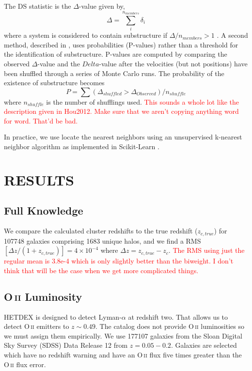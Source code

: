 \documentclass[apj, revtex4]{emulateapj}
\makeatletter
\newcommand{\editorial}[1]{\textcolor{red}{#1} }
\DeclareRobustCommand{\ion}[2]{%
\relax\ifmmode
\ifx\testbx\f@series
{\mathbf{#1\,\mathsc{#2}}}\else
{\mathrm{#1\,\mathsc{#2}}}\fi
\else\textup{#1\,{\mdseries\textsc{#2}}}%
\fi}
\makeatother
\begin{document}
The DS statistic is the $\Delta$-value given by, 
\begin{equation}
	\Delta = \sum^{n_{members}}_i \delta_i
\end{equation}
where a system is considered to contain substructure if $\Delta/n_{members} > 1$ \citep{Dressler1988}. A second method, described in \cite{Hou2012}, uses probabilities (P-values) rather than a threshold for the identification of substructure. P-values are computed by comparing the observed $\Delta$-value and the $Delta$-value after the velocities (but not positions) have been shuffled through a series of Monte Carlo runs. The probability of the existence of substructure becomes
\begin{equation}
	P = \sum (\Delta_{shuffled} > \Delta_{Observed}) / n_{shuffle}
\end{equation}
where $n_{shuffle}$ is the number of shufflings used. \editorial{This sounds a whole lot like the description given in Hou2012. Make sure that we aren't copying anything word for word. That'd be bad.}

In practice, we use locate the nearest neighbors using an unsupervised k-nearest neighbor algorithm as implemented in Scikit-Learn \citep{Pedregosa2012}. 

\section{RESULTS}

\subsection{Full Knowledge}
We compare the calculated cluster redshifts to the true redshift ($z_{c,true}$) for 107748 galaxies comprising 1683 unique halos, and we find a RMS$[\Delta z/(1+z_{c,true})]= 4\times 10^{-4}$ where $\Delta z = z_{c,true} - z_{c}$. \editorial{The RMS using just the regular mean is 3.8e-4 which is only slightly better than the biweight. I don't think that will be the case when we get more complicated things.}




\subsection{\ion{O}{ii} Luminosity}

HETDEX is designed to detect Lyman-$\alpha$ at redshift two. That allows us to detect \ion{O}{ii} emitters to $z\sim 0.49$. The catalog does not provide \ion{O}{ii} luminosities so we must assign them empirically. We use 177107 galaxies from the Sloan Digital Sky Survey (SDSS) Data Release 12 \citep{Alam2015} from $z = 0.05 - 0.2$. Galaxies are selected which have no redshift warning and have an \ion{O}{ii} flux five times greater than the \ion{O}{ii} flux error. 
\end{document}
